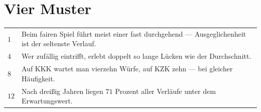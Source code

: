 \section{Vier Muster}

\begin{merksatz}
\begin{center}
{\small
\renewcommand{\arraystretch}{1.48}
\begin{tabular}{@{}P{1.4cm}P{7.0cm}@{}}
\toprule
$1$ & Beim fairen Spiel führt meist einer fast durchgehend --- Ausgeglichenheit ist der seltenste Verlauf.\\
$4$ & Wer zufällig eintrifft, erlebt doppelt so lange Lücken wie der Durchschnitt.\\
$8$ & Auf KKK wartet man vierzehn Würfe, auf KZK zehn --- bei gleicher Häufigkeit.\\
$12$ & Nach dreißig Jahren liegen $71$ Prozent aller Verläufe unter dem Erwartungswert.\\
\bottomrule
\end{tabular}}
\end{center}

\begin{center}
\begin{minipage}{0.88\textwidth}
\end{minipage}
\end{center}
\end{merksatz}

